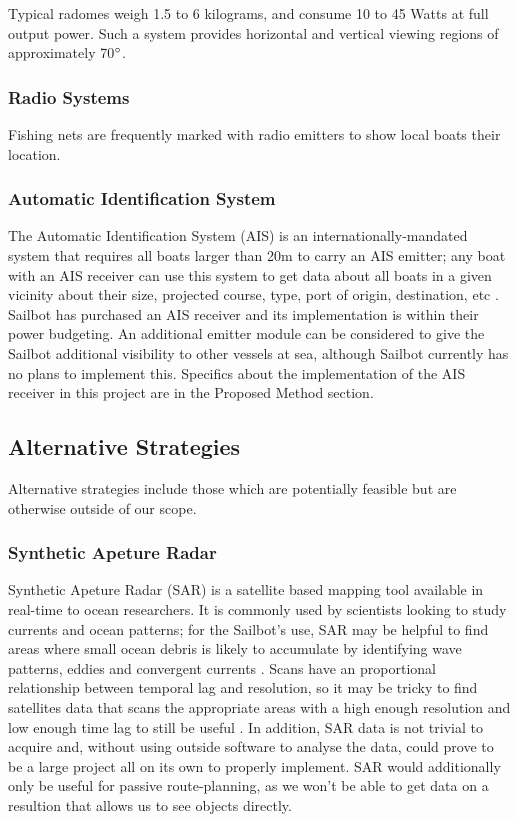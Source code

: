 Typical radomes weigh 1.5 to 6 kilograms, and consume 10 to 45 Watts at full output power. Such a system provides horizontal and vertical viewing regions of approximately 70$\degree$.

\subsubsection{\label{sec:intro:technical-background:radio}Radio Systems}
Fishing nets are frequently marked with radio emitters to show local boats their location.

\subsubsection{\label{sec:intro:technical-background:ais}Automatic Identification System}
The Automatic Identification System (AIS) is an internationally-mandated system that requires all boats larger than 20m to carry an AIS emitter; any boat with an AIS receiver can use this system to get data about all boats in a given vicinity about their size, projected course, type, port of origin, destination, etc  \cite{us-ais-requirements}. Sailbot has purchased an AIS receiver and its implementation is within their power budgeting. An additional emitter module can be considered to give the Sailbot additional visibility to other vessels at sea, although Sailbot currently has no plans to implement this. Specifics about the implementation of the AIS receiver in this project are in the Proposed Method section.


\subsection{\label{sec:intro:alternatives}Alternative Strategies}
Alternative strategies include those which are potentially feasible but are otherwise outside of our scope. 


\subsubsection{\label{sec:intro:alternatives:sar}Synthetic Apeture Radar}
Synthetic Apeture Radar (SAR) is a satellite based mapping tool available in real-time to ocean researchers. It is commonly used by scientists looking to study currents and ocean patterns; for the Sailbot's use, SAR may be helpful to find areas where small ocean debris is likely to accumulate by identifying wave patterns, eddies and convergent currents  \cite{SAR-manual}. Scans have an proportional relationship between temporal lag and resolution, so it may be tricky to find satellites data that scans the appropriate areas with a high enough resolution and low enough time lag to still be useful \cite{Mace}. In addition, SAR data is not trivial to acquire and, without using outside software to analyse the data, could prove to be a large project all on its own to properly implement. SAR would additionally only be useful for passive route-planning, as we won't be able to get data on a resultion that allows us to see objects directly.

